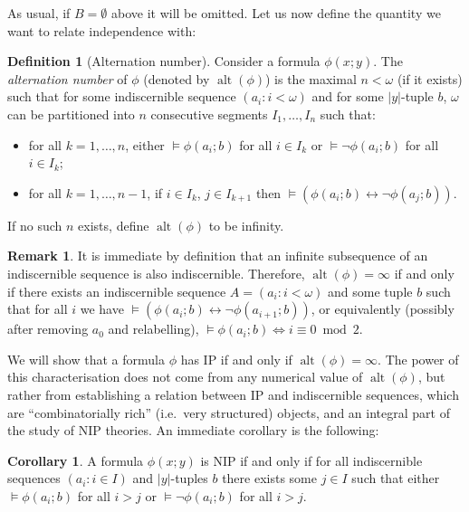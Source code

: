 \documentclass[a4paper]{report}
\newcommand{\ind}{\hspace{15pt}}
\renewcommand{\iff}{\Leftrightarrow}
\newcommand{\siff}{\leftrightarrow}
\DeclareMathOperator{\alt}{alt}
\theoremstyle{definition}
\newtheorem{cor}[thm]{Corollary}
\newtheorem{defn}[thm]{Definition}
\theoremstyle{remstyle}
\newtheorem{rem}[thm]{Remark}
\begin{document}
\ind As usual, if $B=\emptyset$ above it will be omitted. Let us now define the quantity we want to relate independence with:

\begin{defn}[Alternation number]\label{defalt}
	Consider a formula $\phi(x;y)$. The \emph{alternation number} of $\phi$ (denoted by $\alt(\phi)$) is the maximal $n<\omega$ (if it exists) such that for some indiscernible sequence $(a_i:i<\omega)$ and for some $|y|$-tuple $b$, $\omega$ can be partitioned into $n$ consecutive segments $I_1,\ldots,I_n$ such that:
	\begin{itemize}
		\item for all $k=1,\ldots,n$, either $\models \phi(a_i;b)$ for all $i\in I_k$ or $\models\neg\phi(a_i;b)$ for all $i\in I_k$;
		\item for all $k=1,\ldots,n-1$, if $i\in I_k$, $j\in I_{k+1}$ then $\models (\phi(a_i;b)\siff\neg\phi(a_j;b))$.
	\end{itemize}

	If no such $n$ exists, define $\alt(\phi)$ to be infinity.
\end{defn}

\begin{rem}\label{equivalt}
	It is immediate by definition that an infinite subsequence of an indiscernible sequence is also indiscernible. Therefore, $\alt(\phi)=\infty$ if and only if there exists an indiscernible sequence $A=(a_i:i<\omega)$ and some tuple $b$ such that for all $i$ we have $\models (\phi(a_i;b)\siff\neg\phi(a_{i+1};b))$, or equivalently (possibly after removing $a_0$ and relabelling), $\models \phi(a_i;b)\iff i\equiv 0\bmod 2$.
\end{rem}

\ind We will show that a formula $\phi$ has IP if and only if $\alt(\phi)=\infty$. The power of this characterisation does not come from any numerical value of $\alt(\phi)$, but rather from establishing a relation between IP and indiscernible sequences, which are ``combinatorially rich'' (i.e.\ very structured) objects, and an integral part of the study of NIP theories. An immediate corollary is the following:

\begin{cor}\label{nipendsegment}
	A formula $\phi(x;y)$ is NIP if and only if for all indiscernible sequences $(a_i:i\in I)$ and $|y|$-tuples $b$ there exists some $j \in I$ such that either $\models\phi(a_i;b)$ for all $i>j$ or $\models\neg\phi(a_i;b)$ for all $i> j$.
\end{cor}
\end{document}
